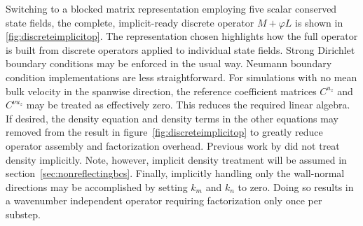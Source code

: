 \documentclass[letterpaper,11pt,nointlimits,reqno,draft]{amsbook}
\begin{document}
Switching to a blocked matrix representation employing five scalar conserved
state fields, the complete, implicit-ready discrete operator $M+\varphi{}L$ is
shown in \autoref{fig:discreteimplicitop}.  The representation chosen
highlights how the full operator is built from discrete operators applied to
individual state fields.  Strong Dirichlet boundary conditions may be enforced
in the usual way.  Neumann boundary condition implementations are less
straightforward.  For simulations with no mean bulk velocity in the spanwise
direction, the reference coefficient matrices $C^{u_z}$ and $C^{\nu{}u_z}$ may
be treated as effectively zero.  This reduces the required linear algebra.  If
desired, the density equation and density terms in the other equations may
removed from the result in figure~\ref{fig:discreteimplicitop} to greatly
reduce operator assembly and factorization overhead.  Previous work by
\citet{Guarini1998} did not treat density implicitly.  Note, however, implicit
density treatment will be assumed in section~\ref{sec:nonreflectingbcs}.
Finally, implicitly handling only the wall-normal directions may be
accomplished by setting $k_{m}$ and $k_{n}$ to zero.  Doing so results in a
wavenumber independent operator requiring factorization only once per substep.
\end{document}
